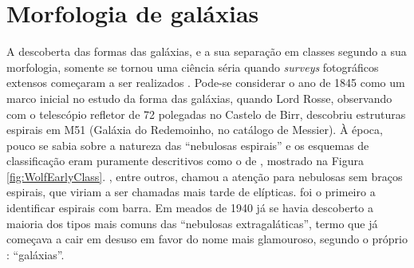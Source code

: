 


\chapter{Morfologia de galáxias}
\label{sec:morph}

A descoberta das formas das galáxias, e a sua separação em classes segundo a sua
morfologia, somente se tornou uma ciência séria quando {\em surveys}
fotográficos extensos começaram a ser realizados \citep{Sandage1975}. Pode-se
considerar o ano de 1845 como um marco inicial no estudo da forma das galáxias,
quando Lord Rosse, observando com o telescópio refletor de 72 polegadas no
Castelo de Birr, descobriu estruturas espirais em M51 (Galáxia do Redemoinho, no
catálogo de Messier). À época, pouco se sabia sobre a natureza das ``nebulosas
espirais'' e os esquemas de classificação eram puramente descritivos como o de
\citet{Wolf1908}, mostrado na Figura \ref{fig:WolfEarlyClass}.
\citet{Knox-Shaw1915}, entre outros, chamou a atenção para nebulosas sem braços
espirais, que viriam a ser chamadas mais tarde de elípticas.
\citet{Curtis1918} foi o primeiro a identificar espirais com barra.
Em meados de 1940 já se havia descoberto a maioria dos tipos mais comuns das
``nebulosas extragaláticas'', termo que já começava a cair em desuso em favor do
nome mais glamouroso, segundo o próprio \citet{hubble1936}: ``galáxias''.

